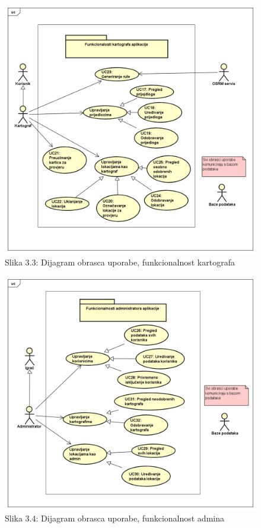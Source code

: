 				\begin{figure}[H]
        			\includegraphics[scale=0.5]{slike/UCDiagrami/kartograf.png} %
        			\centering
        			\caption{Slika 3.3: Dijagram obrasca uporabe, funkcionalnost kartografa}
        			\label{fig:promjene}
        		\end{figure}
					
				\begin{figure}[H]
        			\includegraphics[scale=0.5]{slike/UCDiagrami/admin.png} %
        			\centering
        			\caption{Slika 3.4: Dijagram obrasca uporabe, funkcionalnost admina}
        			\label{fig:promjene}
        		\end{figure}
				
